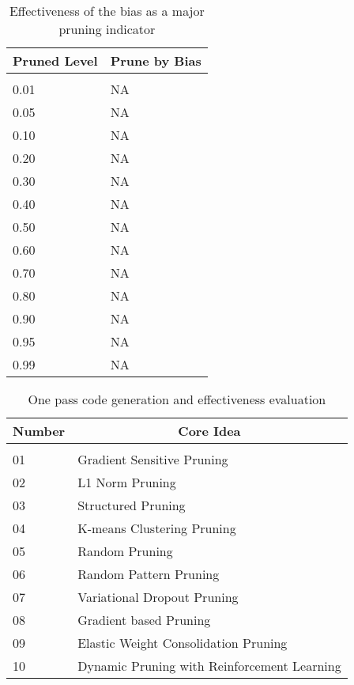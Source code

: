 \documentclass{article} %
\begin{document}
\begin{table}[t]
\caption{Effectiveness of the bias as a major pruning indicator}
\label{table-3}
\begin{center}
\begin{tabular}{ll}
\multicolumn{1}{c}{\bf Pruned Level}  &\multicolumn{1}{c}{\bf Prune by Bias}
\\ \hline \\
0.01         &NA \\
0.05         &NA \\
0.10         &NA \\
0.20         &NA \\
0.30         &NA \\
0.40         &NA \\
0.50         &NA \\
0.60         &NA \\
0.70         &NA \\
0.80         &NA \\
0.90         &NA \\
0.95         &NA \\
0.99         &NA \\
\end{tabular}
\end{center}
\end{table}

\begin{table}[t]
\caption{One pass code generation and effectiveness evaluation}
\label{table-4}
\begin{center}
\begin{tabular}{ll}
\multicolumn{1}{c}{\bf Number}  &\multicolumn{1}{c}{\bf Core Idea}
\\ \hline \\
01         &Gradient Sensitive Pruning \\
02         &L1 Norm Pruning \\
03         &Structured Pruning \\
04         &K-means Clustering Pruning \\
05         &Random Pruning \\
06         &Random Pattern Pruning \\
07         &Variational Dropout Pruning \\
08         &Gradient based Pruning \\
09         &Elastic Weight Consolidation Pruning \\
10         &Dynamic Pruning with Reinforcement Learning \\
\end{tabular}
\end{center}
\end{table}
\end{document}
